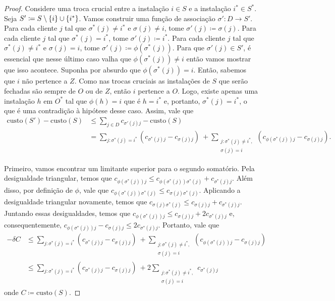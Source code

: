 \begin{proof}
Considere uma troca crucial entre a instalação $i \in S$ e a instalação $ i^* \in S^*$. Seja $S' \coloneqq S \setminus \{i\} \cup \{i^*\}$. Vamos construir uma função de associação $\sigma' : D \rightarrow S'$. Para cada cliente $j$ tal que $\sigma^*(j) \neq i^*$ e $\sigma(j) \neq i$, tome $\sigma'(j) \coloneqq \sigma(j)$. Para cada cliente $j$ tal que $\sigma^*(j) = i^*$, tome $\sigma'(j)\coloneqq i^*$. Para cada cliente $j$ tal que $\sigma^*(j) \neq i^*$ e $\sigma(j)=i$, tome $\sigma'(j) \coloneqq \phi(\sigma^*(j))$. Para que $\sigma'(j) \in S'$, é essencial que nesse último caso valha que $\phi(\sigma^*(j)) \neq i$ então vamos mostrar que isso acontece. Suponha por absurdo que $\phi(\sigma^*(j))=i$. Então, sabemos que $i$ não pertence a $Z$. Como nas trocas cruciais as instalações de $S$ que serão fechadas são sempre de $O$ ou de $Z$, então $i$ pertence a $O$. Logo, existe apenas uma instalação $h$ em $O^*$ tal que $\phi(h) = i$ que é $h = i^*$ e, portanto, $\sigma^*(j) = i^*$, o que é uma contradição à hipótese desse caso. Assim, vale que 
\begin{subequations}
    \begin{align*}
        \text{custo}(S') - \text{custo}(S) &\leq \sum_{j \in D} c_{\sigma'(j)j} - \text{custo}(S) \\
        & = \sum_{j:\sigma^*(j) = i^*} (c_{\sigma^*(j)j} - c_{\sigma(j)j}) \ + \sum_{\substack{j : \sigma^*(j)\neq i^*,\\ \sigma(j) = i}} (c_{\phi(\sigma^*(j))j} - c_{\sigma(j)j}).
    \end{align*}
\end{subequations}

Primeiro, vamos encontrar um limitante superior para o segundo somatório. Pela desigualdade triangular, temos que $c_{\phi(\sigma^*(j))j} \leq c_{\phi(\sigma^*(j))\sigma^*(j)}+c_{\sigma^*(j)j}$. Além disso, por definição de $\phi$, vale que $c_{\phi(\sigma^*(j))\sigma^*(j)}\leq c_{\sigma(j)\sigma^*(j)}$. Aplicando a desigualdade triangular novamente, temos que $c_{\sigma(j)\sigma^*(j)} \leq c_{\sigma(j)j} + c_{\sigma^*(j)j}$. Juntando essas desigualdades, temos que $c_{\phi(\sigma^*(j))j} \leq c_{\sigma(j)j} + 2c_{\sigma^*(j)j}$ e, consequentemente, $c_{\phi(\sigma^*(j))j} - c_{\sigma(j)j} \leq 2c_{\sigma^*(j)j}$. Portanto, vale que
\begin{subequations}
\begin{align*}
    - \delta C &\leq \sum_{j:\sigma^*(j) = i^*} (c_{\sigma^*(j)j} - c_{\sigma(j)j}) \ + \sum_{\substack{j : \sigma^*(j)\neq i^*, \\ \sigma(j) = i}} (c_{\phi(\sigma^*(j))j} - c_{\sigma(j)j}) \\
    &\leq \sum_{j:\sigma^*(j) = i^*} (c_{\sigma^*(j)j} - c_{\sigma(j)j}) \ + 2\sum_{\substack{j : \sigma^*(j)\neq i^*,\\ \sigma(j) = i}} c_{\sigma^*(j)j}
\end{align*}
\end{subequations}
onde $C\coloneqq \text{custo}(S)$.


\end{proof}
